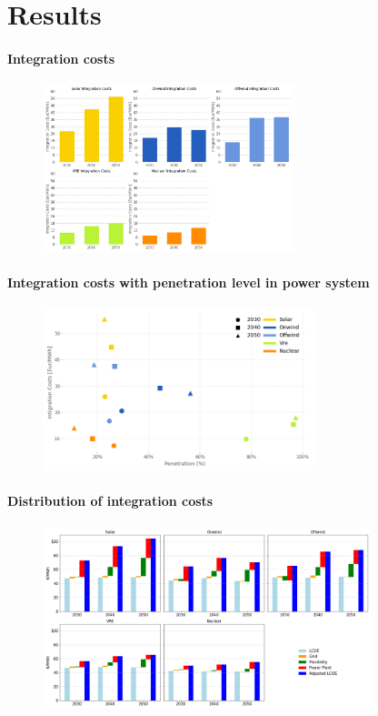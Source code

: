\documentclass[aspectratio=169]{beamer}
\begin{document}
\section{Results}
\begin{frame}{\insertsectionhead}
\framesubtitle{Integration costs}
\begin{figure}
    \centering
    \includegraphics[width=0.65\textwidth]{overnight_inti.png}
  
  \end{figure}
\end{frame}

\begin{frame}{\insertsectionhead}
\framesubtitle{Integration costs with penetration level in power system}
\begin{figure}
    \centering
    \includegraphics[width=0.7\textwidth]{pen.png}
  
  \end{figure}
\end{frame}


\begin{frame}{\insertsectionhead}
\framesubtitle{Distribution of integration costs}
\begin{figure}
    \centering
    \includegraphics[width=0.85\textwidth]{cossts.png}
  
  \end{figure}
\end{frame}
\end{document}
